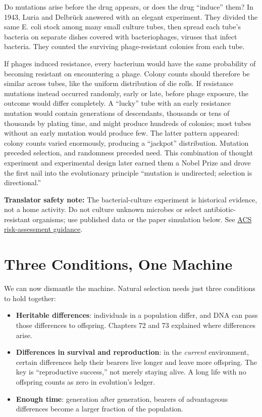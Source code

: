 \begin{zhengju}
Do mutations arise before the drug appears, or does the drug ``induce'' them? In 1943, Luria and Delbrück answered with an elegant experiment. They divided the same E. coli stock among many small culture tubes, then spread each tube's bacteria on separate dishes covered with bacteriophages, viruses that infect bacteria. They counted the surviving phage-resistant colonies from each tube.

If phages induced resistance, every bacterium would have the same probability of becoming resistant on encountering a phage. Colony counts should therefore be similar across tubes, like the uniform distribution of die rolls. If resistance mutations instead occurred randomly, early or late, before phage exposure, the outcome would differ completely. A ``lucky'' tube with an early resistance mutation would contain generations of descendants, thousands or tens of thousands by plating time, and might produce hundreds of colonies; most tubes without an early mutation would produce few. The latter pattern appeared: colony counts varied enormously, producing a ``jackpot'' distribution. Mutation preceded selection, and randomness preceded need. This combination of thought experiment and experimental design later earned them a Nobel Prize and drove the first nail into the evolutionary principle ``mutation is undirected; selection is directional.''
\end{zhengju}

\textbf{Translator safety note:} The bacterial-culture experiment is historical evidence, not a home activity. Do not culture unknown microbes or select antibiotic-resistant organisms; use published data or the paper simulation below. See \href{https://institute.acs.org/acs-center/lab-safety/education-training/safer-experiments.html}{ACS risk-assessment guidance}.

\section{Three Conditions, One Machine}

We can now dismantle the machine. Natural selection needs just three conditions to hold together:

\begin{itemize}[itemsep=2pt]
\item \textbf{Heritable differences}: individuals in a population differ, and DNA can pass those differences to offspring. Chapters 72 and 73 explained where differences arise.
\item \textbf{Differences in survival and reproduction}: in the \emph{current} environment, certain differences help their bearers live longer and leave more offspring. The key is ``reproductive success,'' not merely staying alive. A long life with no offspring counts as zero in evolution's ledger.
\item \textbf{Enough time}: generation after generation, bearers of advantageous differences become a larger fraction of the population.
\end{itemize}


